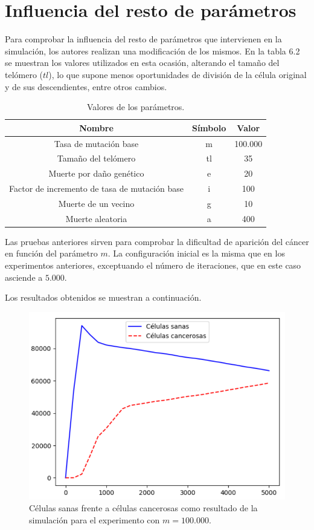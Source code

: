 \clearpage

\section{Influencia del resto de parámetros}

Para comprobar la influencia del resto de parámetros que intervienen en la simulación,
los autores realizan una modificación de los mismos. En la tabla 6.2 se muestran los valores
utilizados en esta ocasión, alterando el tamaño del telómero ($tl$), lo que supone
menos oportunidades de división de la célula original y de sus descendientes, entre otros
cambios.

\begin{table}[h!]
  \centering
  \caption{Valores de los parámetros.}
  \label{tab:table1}
  \begin{tabular}{ccc}
    \toprule
    Nombre & Símbolo & Valor\\
    \midrule
    Tasa de mutación base & m & 100.000\\
    Tamaño del telómero & tl & 35\\
    Muerte por daño genético & e & 20\\
    Factor de incremento de tasa de mutación base & i & 100\\
    Muerte de un vecino & g & 10\\
    Muerte aleatoria & a & 400\\
    \bottomrule
  \end{tabular}
\end{table}

Las pruebas anteriores sirven para comprobar la dificultad de aparición del cáncer en
función del parámetro $m$. La configuración inicial es la misma que en los experimentos
anteriores, exceptuando el número de iteraciones, que en este caso asciende a $5.000$.

Los resultados obtenidos se muestran a continuación.

\begin{figure}[h]
\centering
\includegraphics[scale=0.8]{figures/experiments/exp4/healthvscarcino}
\caption{Células sanas frente a células cancerosas como resultado de la simulación para el experimento con $m = 100.000$.}
\label{fig:ownexp4-1}
\end{figure}

